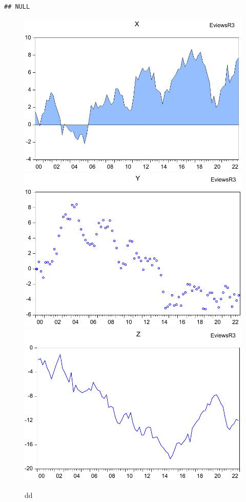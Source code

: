 \documentclass[
]{article}
\newenvironment{Shaded}{\begin{snugshade}}{\end{snugshade}}
\newcommand{\CommentTok}[1]{\textcolor[rgb]{0.56,0.35,0.01}{\textit{#1}}}
\newcommand{\ErrorTok}[1]{\textcolor[rgb]{0.64,0.00,0.00}{\textbf{#1}}}
\newcommand{\SpecialCharTok}[1]{\textcolor[rgb]{0.00,0.00,0.00}{#1}}
\begin{document}
\begin{verbatim}
## NULL
\end{verbatim}

\begin{Shaded}
\end{Shaded}

\begin{figure}[h]

{\centering \includegraphics[width=0.2\linewidth]{test_files/figure-latex//import1-EviewsR3-GRAPH1} \includegraphics[width=0.2\linewidth]{test_files/figure-latex//import1-EviewsR3-GRAPH2} \includegraphics[width=0.2\linewidth]{test_files/figure-latex//import1-EviewsR3-GRAPH3} 

}

\caption{dd}\label{fig:import1}
\end{figure}
\end{document}
